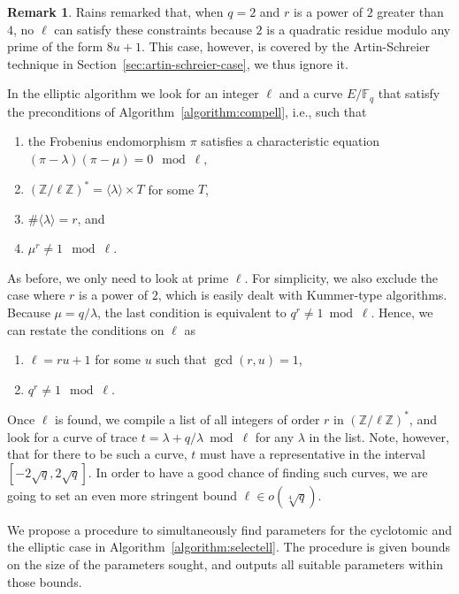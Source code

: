 \documentclass[12pt]{article}
\theoremstyle{plain}
\theoremstyle{definition}
\newtheorem*{remark}{Remark}
\def\Z{\ensuremath{\mathbb{Z}}}
\def\F{\ensuremath{\mathbb{F}}}
\newcounter{algorithm}
\begin{document}
\begin{remark}
  Rains remarked that, when $q=2$ and $r$ is a power of $2$ greater
  than $4$, no $\ell$ can satisfy these constraints because $2$ is a
  quadratic residue modulo any prime of the form $8u+1$. This case,
  however, is covered by the Artin-Schreier technique in
  Section~\ref{sec:artin-schreier-case}, we thus ignore it.
\end{remark}

In the elliptic algorithm we look for an integer $\ell$ and a curve
$E/\F_q$ that satisfy the preconditions of
Algorithm~\ref{algorithm:compell}, i.e., such that 
\begin{enumerate}
\item the Frobenius endomorphism $\pi$ satisfies a characteristic
  equation $(\pi-\lambda)(\pi-\mu) = 0 \mod \ell$,
\item $(\Z/\ell\Z)^\ast = \langle\lambda\rangle\times T$ for some $T$,
\item $\#\langle\lambda\rangle=r$, and
\item $\mu^r\ne1\mod\ell$.
\end{enumerate}

As before, we only need to look at prime $\ell$. For simplicity, we
also exclude the case where $r$ is a power of $2$, which is easily
dealt with Kummer-type algorithms. Because $\mu=q/\lambda$, the last
condition is equivalent to $q^r\ne1\bmod\ell$. Hence, we can restate
the conditions on $\ell$ as
\begin{enumerate}
\item $\ell = ru+1$ for some $u$ such that $\gcd(r,u)=1$,
\item $q^r\ne1\mod\ell$.
\end{enumerate}
Once $\ell$ is found, we compile a list of all integers of order $r$
in $(\Z/\ell\Z)^\ast$, and look for a curve of trace
$t=\lambda+q/\lambda\bmod\ell$ for any $\lambda$ in the list. Note,
however, that for there to be such a curve, $t$ must have a
representative in the interval $[-2\sqrt{q},2\sqrt{q}]$. In order to
have a good chance of finding such curves, we are going to set an even
more stringent bound $\ell\in o(\sqrt[4]{q})$.

We propose a procedure to simultaneously find parameters for the
cyclotomic and the elliptic case in
Algorithm~\ref{algorithm:selectell}. The procedure is given bounds on
the size of the parameters sought, and outputs all suitable parameters
within those bounds.
\end{document}
